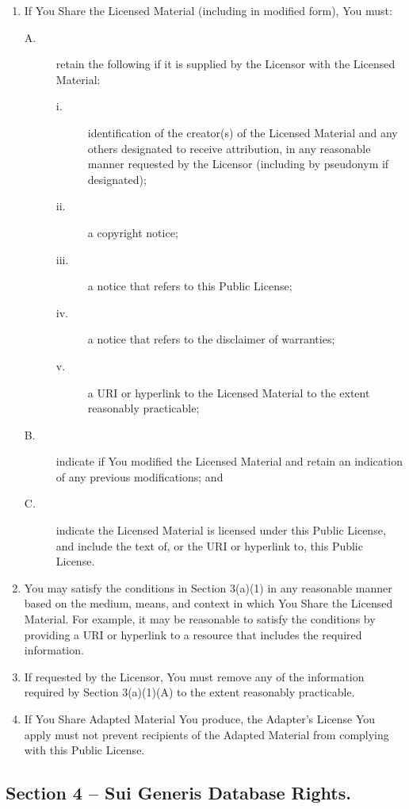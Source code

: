 \documentclass[12pt,a4paper]{article}
\begin{document}
\begin{enumerate}
\setlength{\itemsep}{0cm}
\item If You Share the Licensed Material (including in modified form), You must:
\begin{description}
\item[A.]            retain the following if it is supplied by the Licensor with the Licensed Material:
\begin{description}
\item[i.]                identification of the creator(s) of the Licensed Material and any others designated to receive attribution, in any reasonable manner requested by the Licensor (including by pseudonym if designated);
\item[ii.]                a copyright notice;
\item[iii.]                a notice that refers to this Public License;
\item[iv.]                a notice that refers to the disclaimer of warranties;
\item[v.]                a URI or hyperlink to the Licensed Material to the extent reasonably practicable;
\end{description}
\item[B.] indicate if You modified the Licensed Material and retain an indication of any previous modifications; and
\item[C.] indicate the Licensed Material is licensed under this Public License, and include the text of, or the URI or hyperlink to, this Public License.
\end{description}
\item You may satisfy the conditions in Section 3(a)(1) in any reasonable manner based on the medium, means, and context in which You Share the Licensed Material. For example, it may be reasonable to satisfy the conditions by providing a URI or hyperlink to a resource that includes the required information.
\item        If requested by the Licensor, You must remove any of the information required by Section 3(a)(1)(A) to the extent reasonably practicable.
\item        If You Share Adapted Material You produce, the Adapter's License You apply must not prevent recipients of the Adapted Material from complying with this Public License.
\end{enumerate}

\subsection*{Section 4 – Sui Generis Database Rights.}
\end{document}
